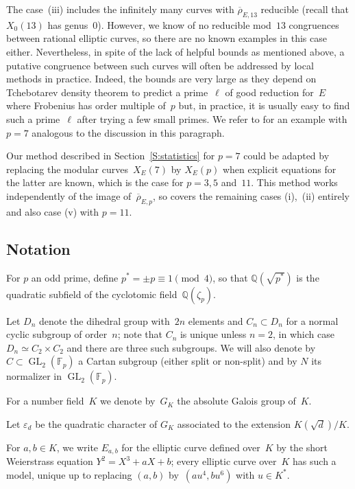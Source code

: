 \documentclass[12pt, reqno]{amsart}
\newcommand{\Fp}{\mathbb{F}_p}
\newcommand{\Q}{\mathbb{Q}}
\newcommand{\rhobar}{{\overline{\rho}}}
\newcommand{\eps}{\varepsilon}
\newcommand{\GL}{\operatorname{GL}}
\numberwithin{equation}{section}
\theoremstyle{definition}
\theoremstyle{remark}
\begin{document}
The case~(iii) includes the infinitely many curves with
$\rhobar_{E,13}$ reducible (recall that $X_0(13)$ has genus~0). However, 
we know of no reducible mod~$13$ congruences between rational elliptic curves, so there are no known examples in this case either. Nevertheless, in spite of the lack of helpful bounds as mentioned above, a putative congruence
between such curves will often be addressed by local methods in
practice. Indeed, the bounds are very large as they depend on
Tchebotarev density theorem to predict a prime~$\ell$ of good
reduction for~$E$ where Frobenius has order multiple of~$p$ but,
in practice, it is usually easy to find such a prime~$\ell$ after
trying a few small primes.
We refer to \cite[Example~31.2]{FKSym} for
an example with $p=7$ analogous to the discussion in this paragraph.

Our method described in Section~\ref{S:statistics} for $p=7$ could be
adapted by replacing the modular curves~$X_E(7)$ by $X_E(p)$ when
explicit equations for the latter are known, which is the case for
$p=3,5$ and~$11$. This method works independently of the image
of~$\rhobar_{E,p}$, so covers the remaining cases (i),~(ii) entirely and also case (v) with $p=11$.

\subsection{Notation} \label{S:notation}
For $p$ an odd prime, define $p^*=\pm p\equiv1\pmod4$, so that
$\Q(\sqrt{p^*})$ is the quadratic subfield of the cyclotomic
field~$\Q(\zeta_p)$.

Let $D_{n}$ denote the dihedral group with~$2n$ elements and $C_n
\subset D_{n}$ for a normal cyclic subgroup of order~$n$; note that
$C_n$ is unique unless $n=2$, in which case $D_{n} \simeq C_2 \times
C_2$ and there are three such subgroups.  We will also denote by $C
\subset \GL_2(\Fp)$ a Cartan subgroup (either split or non-split) and
by $N$ its normalizer in $\GL_2(\Fp)$.

For a number field~$K$ we denote by~$G_K$ the absolute Galois group
of~$K$.

Let $\eps_d$ be the quadratic character of $G_K$ associated to the
extension $K(\sqrt{d})/K$.

For $a, b \in K$, we write $E_{a,b}$ for the elliptic
curve defined over~$K$ by the short Weierstrass equation
$Y^2=X^3+aX+b$; every elliptic curve over~$K$ has such a model, unique
up to replacing $(a,b)$ by~$(au^4,bu^6)$ with $u\in K^*$.
\end{document}
